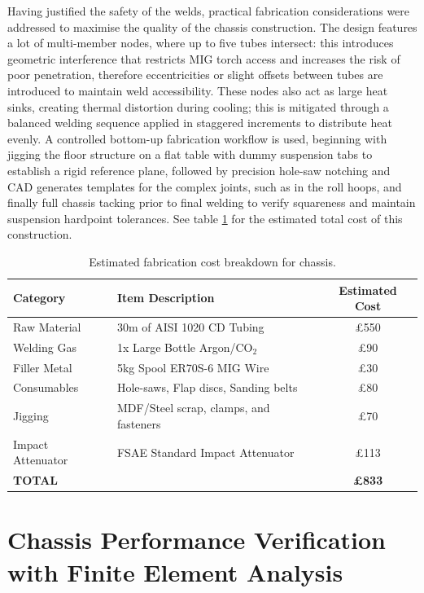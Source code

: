 Having justified the safety of the welds, practical fabrication considerations were addressed to maximise the quality of the chassis construction. The design features a lot of multi-member nodes, where up to five tubes intersect: this introduces geometric interference that restricts MIG torch access and increases the risk of poor penetration, therefore eccentricities or slight offsets between tubes are introduced to maintain weld accessibility. These nodes also act as large heat sinks, creating thermal distortion during cooling; this is mitigated through a balanced welding sequence applied in staggered increments to distribute heat evenly. A controlled bottom-up fabrication workflow is used, beginning with jigging the floor structure on a flat table with dummy suspension tabs to establish a rigid reference plane, followed by precision hole-saw notching and CAD generates templates for the complex joints, such as in the roll hoops, and finally full chassis tacking prior to final welding to verify squareness and maintain suspension hardpoint tolerances. See table \ref{tab:chassis_cost_breakdown} for the estimated total cost of this construction.

\begin{table}[h]
    \centering
    \caption{Estimated fabrication cost breakdown for chassis.}
    \label{tab:chassis_cost_breakdown}
    \footnotesize
    \begin{tabular}{|l|l|c|}
        \hline
        \textbf{Category} & \textbf{Item Description} & \textbf{Estimated Cost} \\
        \hline
        Raw Material & 30m of AISI 1020 CD Tubing \cite{matweb_aisi1020} & £550 \\
        Welding Gas & 1x Large Bottle Argon/CO$_2$ & £90 \\
        Filler Metal & 5kg Spool ER70S-6 MIG Wire & £30 \\
        Consumables & Hole-saws, Flap discs, Sanding belts & £80 \\
        Jigging & MDF/Steel scrap, clamps, and fasteners & £70 \\
        Impact Attenuator & FSAE Standard Impact Attenuator \cite{fsae_impact_attenuator} & £113 \\
        \hline
        \textbf{TOTAL} &  & \textbf{£833} \\
        \hline
    \end{tabular}
\end{table}

\section{Chassis Performance Verification with Finite Element Analysis}

